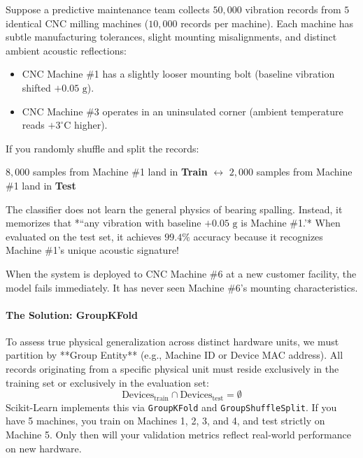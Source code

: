 \begin{example}
Suppose a predictive maintenance team collects $50{,}000$ vibration records from $5$ identical CNC milling machines ($10{,}000$ records per machine). Each machine has subtle manufacturing tolerances, slight mounting misalignments, and distinct ambient acoustic reflections:
\begin{itemize}
    \item CNC Machine \#1 has a slightly looser mounting bolt (baseline vibration shifted $+0.05\text{ g}$).
    \item CNC Machine \#3 operates in an uninsulated corner (ambient temperature reads $+3^\circ\text{C}$ higher).
\end{itemize}

If you randomly shuffle and split the records:
\begin{center}
$8{,}000$ samples from Machine \#1 land in \textbf{Train} $\longleftrightarrow$ $2{,}000$ samples from Machine \#1 land in \textbf{Test}
\end{center}
The classifier does not learn the general physics of bearing spalling. Instead, it memorizes that *``any vibration with baseline $+0.05\text{ g}$ is Machine \#1.'* When evaluated on the test set, it achieves $99.4\%$ accuracy because it recognizes Machine \#1's unique acoustic signature!

When the system is deployed to CNC Machine \#6 at a new customer facility, the model fails immediately. It has never seen Machine \#6's mounting characteristics.
\end{example}

\paragraph{The Solution: GroupKFold}
To assess true physical generalization across distinct hardware units, we must partition by **Group Entity** (e.g., Machine ID or Device MAC address). All records originating from a specific physical unit must reside exclusively in the training set or exclusively in the evaluation set:
\begin{equation}
\text{Devices}_{\text{train}} \cap \text{Devices}_{\text{test}} = \emptyset\label{eq:group_disjoint}
\end{equation}
Scikit-Learn implements this via \texttt{GroupKFold} and \texttt{GroupShuffleSplit}. If you have 5 machines, you train on Machines 1, 2, 3, and 4, and test strictly on Machine 5. Only then will your validation metrics reflect real-world performance on new hardware.

